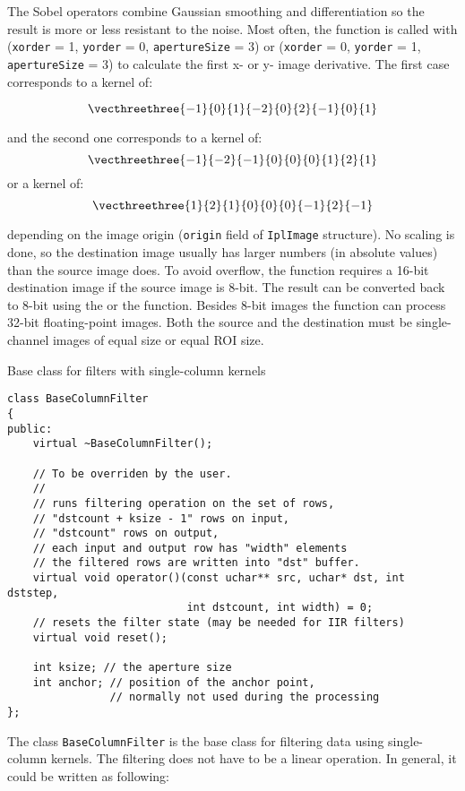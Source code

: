The Sobel operators combine Gaussian smoothing and differentiation
so the result is more or less resistant to the noise. Most often,
the function is called with (\texttt{xorder} = 1, \texttt{yorder} = 0,
\texttt{apertureSize} = 3) or (\texttt{xorder} = 0, \texttt{yorder} = 1,
\texttt{apertureSize} = 3) to calculate the first x- or y- image
derivative. The first case corresponds to a kernel of:

\[ \vecthreethree
{-1}{0}{1}
{-2}{0}{2}
{-1}{0}{1}
\]

and the second one corresponds to a kernel of:
\[ \vecthreethree
{-1}{-2}{-1}
{0}{0}{0}
{1}{2}{1}
\]
or a kernel of:
\[ \vecthreethree
{1}{2}{1}
{0}{0}{0}
{-1}{2}{-1}
\]

depending on the image origin (\texttt{origin} field of
\texttt{IplImage} structure). No scaling is done, so the destination image
usually has larger numbers (in absolute values) than the source image does. To
avoid overflow, the function requires a 16-bit destination image if the
source image is 8-bit. The result can be converted back to 8-bit using the
 or the  function. Besides 8-bit images
the function can process 32-bit floating-point images. Both the source and the 
destination must be single-channel images of equal size or equal ROI size.

\fi

\ifCpp

Base class for filters with single-column kernels

\begin{lstlisting}
class BaseColumnFilter
{
public:
    virtual ~BaseColumnFilter();
    
    // To be overriden by the user.
    //
    // runs filtering operation on the set of rows,
    // "dstcount + ksize - 1" rows on input,
    // "dstcount" rows on output,
    // each input and output row has "width" elements
    // the filtered rows are written into "dst" buffer.
    virtual void operator()(const uchar** src, uchar* dst, int dststep,
                            int dstcount, int width) = 0;
    // resets the filter state (may be needed for IIR filters)
    virtual void reset();
    
    int ksize; // the aperture size
    int anchor; // position of the anchor point,
                // normally not used during the processing
};
\end{lstlisting}

The class \texttt{BaseColumnFilter} is the base class for filtering data using single-column kernels. The filtering does not have to be a linear operation. In general, it could be written as following:

